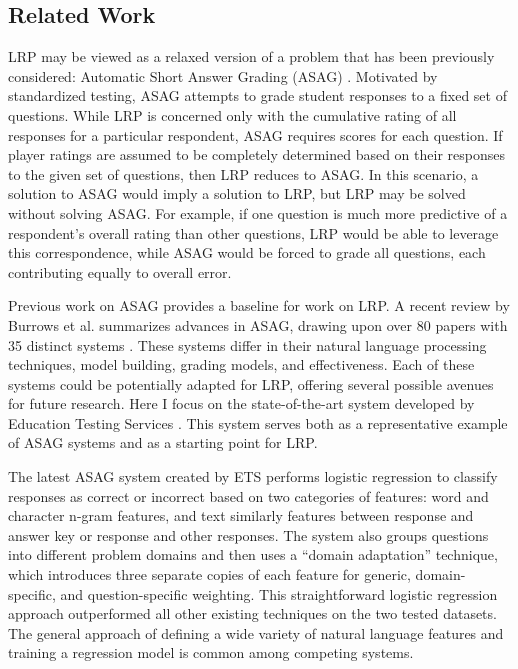 \subsection{Related Work}
LRP may be viewed as a relaxed version of a problem that has been previously considered: Automatic Short Answer Grading (ASAG) \cite{burrows2015eras, pulman2005automatic, sukkarieh2009c, ziai2012short}. Motivated by standardized testing, ASAG attempts to grade student responses to a fixed set of questions. While LRP is concerned only with the cumulative rating of all responses for a particular respondent, ASAG requires scores for each question. If player ratings are assumed to be completely determined based on their responses to the given set of questions, then LRP reduces to ASAG. In this scenario, a solution to ASAG would imply a solution to LRP, but LRP may be solved without solving ASAG. For example, if one question is much more predictive of a respondent's overall rating than other questions, LRP would be able to leverage this correspondence, while ASAG would be forced to grade all questions, each contributing equally to overall error. 

Previous work on ASAG provides a baseline for work on LRP. A recent review by Burrows et al. summarizes advances in ASAG, drawing upon over 80 papers with 35 distinct systems \cite{burrows2015eras}. These systems differ in their natural language processing techniques, model building, grading models, and effectiveness. Each of these systems could be potentially adapted for LRP, offering several possible avenues for future research. Here I focus on the state-of-the-art system developed by Education Testing Services \cite{heilman2013ets}. This system serves both as a representative example of ASAG systems and as a starting point for LRP.

The latest ASAG system created by ETS performs logistic regression to classify responses as correct or incorrect based on two categories of features: word and character n-gram features, and text similarly features between response and answer key or response and other responses. The system also groups questions into different problem domains and then uses a ``domain adaptation'' technique, which introduces three separate copies of each feature for generic, domain-specific, and question-specific weighting. This straightforward logistic regression approach outperformed all other existing techniques on the two tested datasets. The general approach of defining a wide variety of natural language features and training a regression model is common among competing systems.

